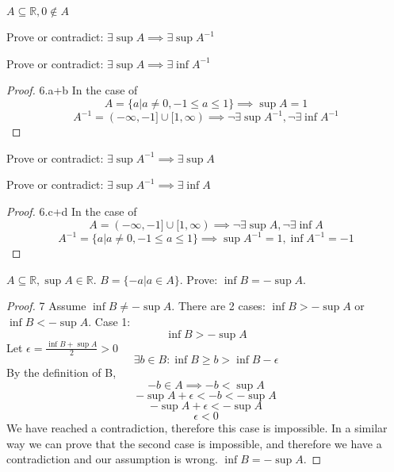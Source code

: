 \documentclass[12pt]{article}
\newenvironment{problem}[2][Problem]{\begin{trivlist}
\item[\hskip \labelsep {\bfseries #1}\hskip \labelsep {\bfseries #2.}]}{\end{trivlist}}
\begin{document}
\begin{problem}{6}
	$A \subseteq \mathbb{R}, 0 \notin A$

\begin{problem}{6.a}
	Prove or contradict: $\exists \sup A \implies \exists \sup A^{-1}$
\end{problem}

\begin{problem}{6.b}
	Prove or contradict: $\exists \sup A \implies \exists \inf A^{-1}$
\end{problem}

\begin{proof}{6.a+b}
	In the case of $$A = \{a | a \ne 0, -1 \le a \le 1\} \implies \sup A = 1 $$
	$$ A^{-1} = (-\infty, -1] \cup [1,\infty) \implies \lnot \exists \sup A^{-1}, \lnot \exists \inf A^{-1}$$
\end{proof}

\begin{problem}{6.c}
	Prove or contradict: $\exists \sup A^{-1} \implies \exists \sup A$
\end{problem}

\begin{problem}{6.d}
	Prove or contradict: $\exists \sup A^{-1} \implies \exists \inf A$
\end{problem}

\begin{proof}{6.c+d}
	In the case of $$A = (-\infty, -1] \cup [1,\infty) \implies \lnot \exists \sup A, \lnot \exists \inf A$$
	$$ A^{-1} = \{a | a \ne 0, -1 \le a \le 1\} \implies \sup A^{-1} = 1, \inf A^{-1} = -1$$
\end{proof}

\begin{problem}{7}
	$A \subseteq \mathbb{R}, \sup A \in \mathbb{R}$. $B = \{-a | a \in A\}$. Prove: $\inf B = -\sup A$.
\end{problem}

\begin{proof}{7}
	Assume $\inf B \ne -\sup A$. There are 2 cases: $\inf B > -\sup A$ or $\inf B < -\sup A$.
	Case 1:
	$$\inf B > -\sup A$$
	Let $\epsilon = \frac{\inf B + \sup A}{2} > 0$
	$$\exists b \in B: \inf B \ge b > \inf B - \epsilon$$
	By the definition of B,
	$$-b \in A \implies -b < \sup A$$
	$$ -\sup A + \epsilon < -b < -\sup A$$
	$$ -\sup A + \epsilon < -\sup A$$
	$$ \epsilon < 0$$
	We have reached a contradiction, therefore this case is impossible. In a similar way we can prove that the second case is impossible, and therefore we have a contradiction and our assumption is wrong. $\inf B = -\sup A$.
\end{proof}

\end{problem}
\end{document}
